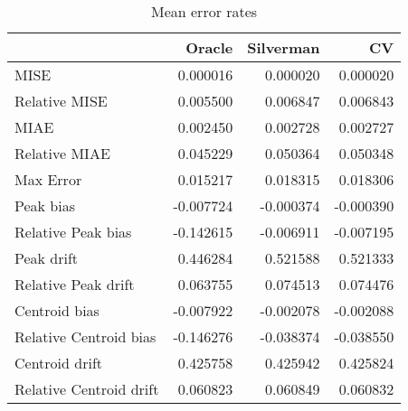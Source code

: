 \begin{table}[H]
\centering
\begin{tabular}{lrrr}
  \hline
 & Oracle & Silverman & CV \\ 
  \hline
MISE & 0.000016 & 0.000020 & 0.000020 \\ 
  Relative MISE & 0.005500 & 0.006847 & 0.006843 \\ 
  MIAE & 0.002450 & 0.002728 & 0.002727 \\ 
  Relative MIAE & 0.045229 & 0.050364 & 0.050348 \\ 
  Max Error & 0.015217 & 0.018315 & 0.018306 \\ 
  Peak bias & -0.007724 & -0.000374 & -0.000390 \\ 
  Relative Peak bias & -0.142615 & -0.006911 & -0.007195 \\ 
  Peak drift & 0.446284 & 0.521588 & 0.521333 \\ 
  Relative Peak drift & 0.063755 & 0.074513 & 0.074476 \\ 
  Centroid bias & -0.007922 & -0.002078 & -0.002088 \\ 
  Relative Centroid bias & -0.146276 & -0.038374 & -0.038550 \\ 
  Centroid drift & 0.425758 & 0.425942 & 0.425824 \\ 
  Relative Centroid drift & 0.060823 & 0.060849 & 0.060832 \\ 
   \hline
\end{tabular}
\caption{Mean error rates} 
\label{tbl:mean_error_rates}
\end{table}
